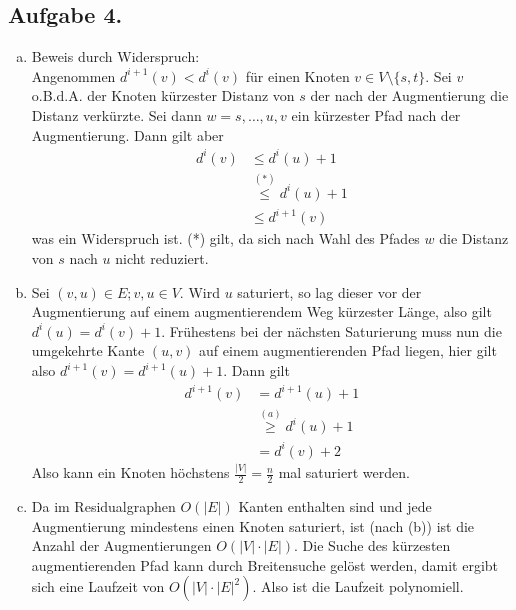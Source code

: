 \documentclass[11pt,a4paper,ngerman]{article}
\begin{document}
\subsection*{Aufgabe 4.}
\begin{enumerate}[a)]
\item Beweis durch Widerspruch: \\
      Angenommen $d^{i+1}(v) < d^i(v)$ für einen Knoten $v \in V \setminus \{s,t\}$.
      Sei $v$ o.B.d.A. der Knoten kürzester Distanz von $s$ der nach der Augmentierung
      die Distanz verkürzte. Sei dann $w = s,\ldots,u,v$ ein kürzester Pfad nach der Augmentierung.
      Dann gilt aber
      \begin{equation*}\begin{split}
        d^{i}(v) & \leq d^{i}(u) + 1 \\
        &\stackrel{(*)}{\leq} d^{i}(u) + 1 \\
        &\leq d^{i+1}(v)
      \end{split}\end{equation*}
      was ein Widerspruch ist.
      (*) gilt, da sich nach Wahl des Pfades $w$ die Distanz von $s$ nach $u$ nicht reduziert.
\item Sei $(v,u) \in E; v,u \in V$. Wird $u$ saturiert, so lag dieser vor der Augmentierung auf einem         
      augmentierendem Weg kürzester Länge, also gilt $d^i(u) = d^i(v) + 1$. Frühestens bei der nächsten   
      Saturierung muss nun die umgekehrte Kante $(u,v)$ auf einem augmentierenden Pfad liegen,
      hier gilt also $d^{i+1}(v) = d^{i+1}(u) + 1$. Dann gilt
      \begin{equation*}\begin{split}
        d^{i+1}(v) & = d^{i+1}(u) + 1 \\
        &\stackrel{(a)}{\geq} d^{i}(u) + 1 \\
        &= d^{i}(v) +2
      \end{split}\end{equation*}
      Also kann ein Knoten höchstens $\frac{|V|}{2} = \frac{n}{2}$ mal saturiert werden.
\item Da im Residualgraphen $O(|E|)$ Kanten enthalten sind und jede Augmentierung mindestens einen Knoten
      saturiert, ist (nach (b)) ist die Anzahl der Augmentierungen $O(|V|\cdot |E|)$. Die Suche des kürzesten
      augmentierenden Pfad kann durch Breitensuche gelöst werden, damit ergibt sich eine Laufzeit von
      $O(|V|\cdot |E|^2)$. Also ist die Laufzeit polynomiell.
\end{enumerate}


\label{LastPage}
\end{document}
